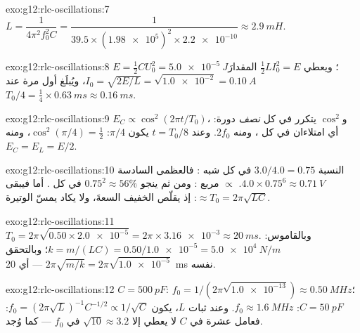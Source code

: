 \begin{solution}{exo:g12:rlc-oscillations:7}
$L = \dfrac{1}{4\pi^2 f_0^2 C} = \dfrac{1}{39.5 \times
(\num{1.98e5})^2 \times \num{2.2e-10}} \approx \qty{2.9}{mH}$.
\end{solution}

\begin{solution}{exo:g12:rlc-oscillations:8}
$E = \tfrac12 CU_0^2 = \qty{5.0e-5}{J}$؛ ويعطي $\tfrac12 LI_0^2 = E$ المقدارَ
$I_0 = \sqrt{2E/L} = \sqrt{\num{1.0e-2}} = \qty{0.10}{A}$، ويُبلَغ أول مرة
عند $T_0/4 = \tfrac14 \times \qty{0.63}{ms} \approx
\qty{0.16}{ms}$.
\end{solution}

\begin{solution}{exo:g12:rlc-oscillations:9}
$E_C \propto \cos^2(2\pi t/T_0)$، و$\cos^2$ يتكرر في كل
\emph{نصف} دورة: أي امتلاءان  في كل ، ومنه
$2f_0$. وعند $t = T_0/8$ يكون  $\pi/4$:
$\cos^2(\pi/4) = \tfrac12$، ومنه $E_C = E_L = E/2$.
\end{solution}

\begin{solution}{exo:g12:rlc-oscillations:10}
النسبة $3.0/4.0 = 0.75$ في كل شبه : فالعظمى السادسة
$4.0 \times 0.75^6 \approx \qty{0.71}{V}$.  $\propto$ مربع :
ومن ثم ينجو $0.75^2 \approx 56\%$ في كل . أما
 فيبقى $\approx T_0 = 2\pi\sqrt{LC}$: إذ يقلّص  الخفيف
السعةَ، ولا يكاد يمسّ الوتيرة.
\end{solution}

\begin{solution}{exo:g12:rlc-oscillations:11}
$T_0 = 2\pi\sqrt{0.50 \times \num{2.0e-5}} = 2\pi \times
\num{3.16e-3} \approx \qty{20}{ms}$. وبالقاموس: $k = m/(LC) =
0.50/\num{1.0e-5} = \qty{5.0e4}{N/m}$؛ وبالتحقق
$2\pi\sqrt{m/k} = 2\pi\sqrt{\num{1.0e-5}}$ --- أي \qty{20}{ms} نفسه.
\end{solution}

\begin{solution}{exo:g12:rlc-oscillations:12}
$C = \qty{500}{pF}$: $f_0 = 1/(2\pi\sqrt{\num{1.0e-13}}) \approx
\qty{0.50}{MHz}$؛ $C = \qty{50}{pF}$: $f_0 \approx \qty{1.6}{MHz}$.
وعند ثبات $L$، يكون $f_0 = (2\pi\sqrt{L})^{-1} C^{-1/2} \propto 1/\sqrt{C}$:
فعامل عشرة في $C$ لا يعطي إلا $\sqrt{10} \approx 3.2$ في $f_0$ --- كما وُجد.
\end{solution}

